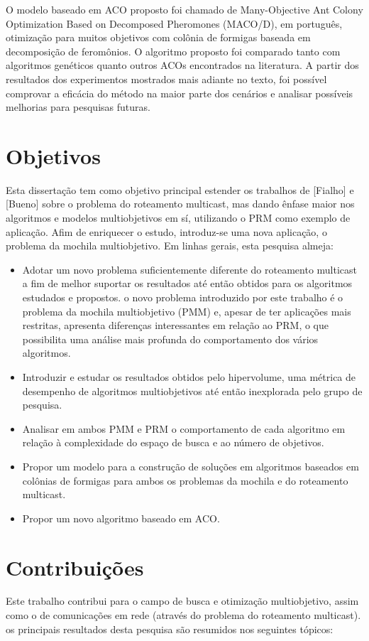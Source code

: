 O modelo baseado em ACO proposto foi chamado de Many-Objective Ant Colony Optimization Based on Decomposed Pheromones (MACO/D), em português, otimização para muitos objetivos com colônia de formigas baseada em decomposição de feromônios. O algoritmo proposto foi comparado tanto com algoritmos genéticos quanto outros ACOs encontrados na literatura. A partir dos resultados dos experimentos mostrados mais adiante no texto, foi possível comprovar a eficácia do método na maior parte dos cenários e analisar possíveis melhorias para pesquisas futuras.

\section{Objetivos}
Esta dissertação tem como objetivo principal estender os trabalhos de [Fialho] e [Bueno] sobre o problema do roteamento multicast, mas dando ênfase maior nos algoritmos e modelos multiobjetivos em sí, utilizando o PRM como exemplo de aplicação. Afim de enriquecer o estudo, introduz-se uma nova aplicação, o problema da mochila multiobjetivo. Em linhas gerais, esta pesquisa almeja:
 
\begin{itemize}  
	\item Adotar um novo problema suficientemente diferente do roteamento multicast a fim de melhor suportar os resultados até então obtidos para os algoritmos estudados e propostos. o novo problema introduzido por este trabalho é o problema da mochila multiobjetivo (PMM) e, apesar de ter aplicações mais restritas, apresenta diferenças interessantes em relação ao PRM, o que possibilita uma análise mais profunda do comportamento dos vários algoritmos.
	\item Introduzir e estudar os resultados obtidos pelo hipervolume, uma métrica de desempenho de algoritmos multiobjetivos até então inexplorada pelo grupo de pesquisa.
	\item Analisar em ambos PMM e PRM o comportamento de cada algoritmo em relação à complexidade do espaço de busca e ao número de objetivos.
	\item Propor um modelo para a construção de soluções em algoritmos baseados em colônias de formigas para ambos os problemas da mochila e do roteamento multicast.
	\item Propor um novo algoritmo baseado em ACO.
\end{itemize}


\section{Contribuições}
Este trabalho contribui para o campo de busca e otimização multiobjetivo, assim como o de comunicações em rede (através do problema do roteamento multicast). os principais resultados desta pesquisa são resumidos nos seguintes tópicos:

